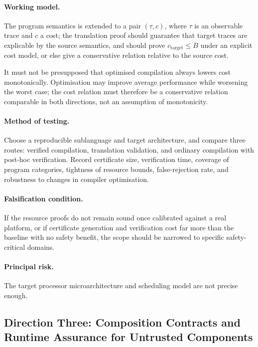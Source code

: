 \paragraph{Working model.}
The program semantics is extended to a pair $(\tau, c)$, where $\tau$ is an observable
trace and $c$ a cost; the translation proof should guarantee that target traces are
explicable by the source semantics, and should prove $c_{\text{target}} \le B$ under an
explicit cost model, or else give a conservative relation relative to the source cost.

\begin{remark}
It must not be presupposed that optimised compilation always lowers cost monotonically.
Optimisation may improve average performance while worsening the worst case; the cost
relation must therefore be a conservative relation comparable in both directions, not an
assumption of monotonicity.
\end{remark}

\paragraph{Method of testing.}
Choose a reproducible sublanguage and target architecture, and compare three routes:
verified compilation, translation validation, and ordinary compilation with post-hoc
verification. Record certificate size, verification time, coverage of program categories,
tightness of resource bounds, false-rejection rate, and robustness to changes in compiler
optimisation.

\paragraph{Falsification condition.}
If the resource proofs do not remain sound once calibrated against a real platform, or if
certificate generation and verification cost far more than the baseline with no safety
benefit, the scope should be narrowed to specific safety-critical domains.

\paragraph{Principal risk.}
The target processor microarchitecture and scheduling model are not precise enough.

\subsection*{Direction Three: Composition Contracts and Runtime Assurance for Untrusted Components}

